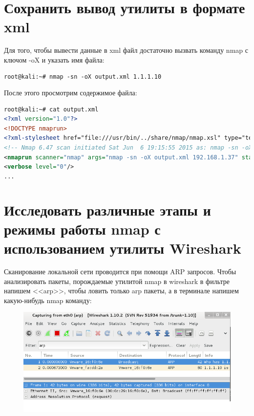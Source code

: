 \documentclass[utf8x, 12pt]{G7-32}
\begin{document}
\newpage
\section{Сохранить вывод утилиты в формате xml}

Для того, чтобы вывести данные в xml файл достаточно вызвать команду nmap с ключом -oX и указать имя файла:

\begin{lstlisting}
root@kali:~# nmap -sn -oX output.xml 1.1.1.10
\end{lstlisting}


После этого просмотрим содержимое файла:

\begin{lstlisting}[language=XML]
root@kali:~# cat output.xml 
<?xml version="1.0"?>
<!DOCTYPE nmaprun>
<?xml-stylesheet href="file:///usr/bin/../share/nmap/nmap.xsl" type="text/xsl"?>
<!-- Nmap 6.47 scan initiated Sat Jun  6 19:15:55 2015 as: nmap -sn -oX output.xml 1.1.1.10 -->
<nmaprun scanner="nmap" args="nmap -sn -oX output.xml 192.168.1.37" start="1433632555" startstr="Sat Jun  6 19:15:55 2015" version="6.47" xmloutputversion="1.04">
<verbose level="0"/>
...
\end{lstlisting}

\newpage
\section{Исследовать различные этапы и режимы работы nmap с использованием утилиты Wireshark}


Сканирование локальной сети проводится при помощи ARP запросов. Чтобы анализировать пакеты, порождаемые утилитой nmap в wireshark в фильтре напишем <<arp>>, чтобы ловить только arp пакеты, а в терминале напишем какую-нибудь nmap  команду:


\begin{figure}[hhh!]
	\begin{center}
		\includegraphics[width=16cm]{img2/28}
	\end{center}
\end{figure}	
\end{document}

